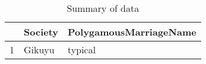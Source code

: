 \begin{table}[ht]
\centering
\begin{tabular}{rll}
  \hline
 & Society & PolygamousMarriageName \\ 
  \hline
1 & Gikuyu & typical \\ 
   \hline
\end{tabular}
\caption{Summary of data} 
\end{table}

